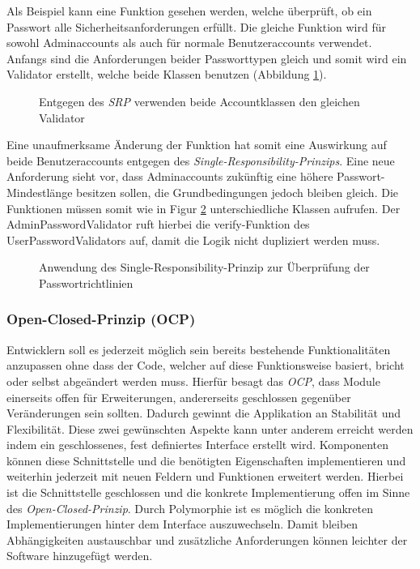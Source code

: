 \documentclass[conference]{IEEEtran}
\begin{document}
Als Beispiel kann eine Funktion gesehen werden, welche überprüft, ob ein Passwort alle Sicherheitsanforderungen erfüllt. Die gleiche Funktion wird für sowohl Adminaccounts als auch für normale Benutzeraccounts verwendet. Anfangs sind die Anforderungen beider Passworttypen gleich und somit wird ein Validator erstellt, welche beide Klassen benutzen (Abbildung \ref{fig:VorSRP}).

\begin{figure}[htbp]
	\small
	\resizebox{250pt}{!}{}
	\caption{Entgegen des \emph{SRP} verwenden beide Accountklassen den gleichen Validator}
	\label{fig:VorSRP}
\end{figure}


Eine unaufmerksame Änderung der Funktion hat somit eine Auswirkung auf beide Benutzeraccounts entgegen des \emph{Single-Responsibility-Prinzips}. Eine neue Anforderung sieht vor, dass Adminaccounts zukünftig eine höhere Passwort-Mindestlänge besitzen sollen, die Grundbedingungen jedoch bleiben gleich. Die Funktionen müssen somit wie in Figur \ref{fig:NachSRP} unterschiedliche Klassen aufrufen. Der AdminPasswordValidator ruft hierbei die verify-Funktion des UserPasswordValidators auf, damit die Logik nicht dupliziert werden muss.

\begin{figure}[htbp]
	\small
	
	\caption{Anwendung des Single-Responsibility-Prinzip zur Überprüfung der Passwortrichtlinien}
	\label{fig:NachSRP}
\end{figure}



\subsubsection{Open-Closed-Prinzip (OCP)} Entwicklern soll es jederzeit möglich sein bereits bestehende Funktionalitäten anzupassen ohne dass der Code, welcher auf diese Funktionsweise basiert, bricht oder selbst abgeändert werden muss. Hierfür besagt das \emph{OCP}, dass Module einerseits offen für Erweiterungen, andererseits geschlossen gegenüber Veränderungen sein sollten. Dadurch gewinnt die Applikation an Stabilität und Flexibilität. Diese zwei gewünschten Aspekte kann unter anderem erreicht werden indem ein geschlossenes, fest definiertes Interface erstellt wird. Komponenten können diese Schnittstelle und die benötigten Eigenschaften implementieren und weiterhin jederzeit mit neuen Feldern und Funktionen erweitert werden. Hierbei ist die Schnittstelle geschlossen und die konkrete Implementierung offen im Sinne des \emph{Open-Closed-Prinzip}. Durch Polymorphie ist es möglich die konkreten Implementierungen hinter dem Interface auszuwechseln. Damit bleiben Abhängigkeiten austauschbar und zusätzliche Anforderungen können leichter der Software hinzugefügt werden. \cite{Meyer.1993} \cite{Martin.2018}
 
\end{document}
